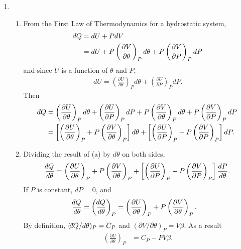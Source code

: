\documentclass[a4paper,12pt]{article}
\def\dbar{{\mathchar'26\mkern-12mu d}}
\begin{document}
\begin{enumerate}
    \item
        \begin{enumerate}
            \item
                From the First Law of Thermodynamics for a hydrostatic system,
                \begin{align*}
                    \dbar Q &= dU + PdV \\
                    &= dU + P \left( \frac{\partial V}{\partial \theta} \right)_P d\theta + P \left( \frac{\partial V}{\partial P} \right)_P dP
                \end{align*}
                and since $U$ is a function of $\theta$ and $P$,
                \begin{align*}
                    dU = \left( \frac{\partial U}{\partial \theta} \right)_P d\theta + \left( \frac{\partial U}{\partial P} \right)_P dP.
                \end{align*}
                Then
                \begin{align*}
                    \dbar Q &= \left( \frac{\partial U}{\partial \theta} \right)_P d\theta + \left( \frac{\partial U}{\partial P} \right)_P dP + P \left( \frac{\partial V}{\partial \theta} \right)_P d\theta + P \left( \frac{\partial V}{\partial P} \right)_P dP \\
                    &= \left[ \left( \frac{\partial U}{\partial \theta} \right)_P + P \left( \frac{\partial V}{\partial \theta} \right)_P \right] d\theta + \left[ \left( \frac{\partial U}{\partial P} \right)_P + P \left( \frac{\partial V}{\partial P} \right)_P \right] dP. \\
                \end{align*}

            \item
                Dividing the result of (a) by $d\theta$ on both sides,
                \begin{align*}
                    \frac{\dbar Q}{d\theta} &= \left( \frac{\partial U}{\partial \theta} \right)_P + P \left( \frac{\partial V}{\partial \theta} \right)_P + \left[ \left( \frac{\partial U}{\partial P} \right)_P + P \left( \frac{\partial V}{\partial P} \right)_P \right] \frac{dP}{d\theta}. \\
                \end{align*}
                If $P$ is constant, $dP = 0$, and
                \begin{align*}
                    \frac{\dbar Q}{d\theta} = \left(\frac{\dbar Q}{d\theta} \right)_P &= \left( \frac{\partial U}{\partial \theta} \right)_P + P \left( \frac{\partial V}{\partial \theta} \right)_P.
                \end{align*}
                By definition, $(\dbar Q / d \theta)_P = C_P$ and $(\partial V / \partial \theta)_P = V \beta$. As a result
                \begin{align*}
                    \left( \frac{\partial U}{\partial \theta} \right)_P &= C_P - PV\beta.
                \end{align*}


\end{enumerate}
\end{enumerate}
\end{document}
